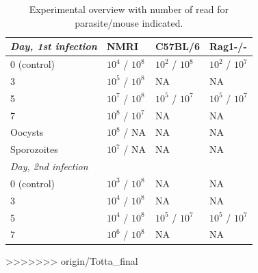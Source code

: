 \documentclass{bmcart}
\begin{document}
	\setlength{\tabcolsep}{14pt}
	\begin{table}[H]
	\small
	\begin{center}
	\caption{Experimental overview with number of read for parasite/mouse indicated.}
\begin{tabular}{*4l}    \toprule
\textit{Day, 1st infection}  	& NMRI  & C57BL/6  & Rag1-/- \\ \midrule
	0 (control)    & $10^4$ / $10^8$  & $10^2$ / $10^8$  & $10^2$ / $10^7$  \\ %
3  		& $10^5$ / $10^8$ & NA  & NA \\ 
5  		& $10^7$ / $10^8$ & $10^5$ / $10^7$  & $10^5$ / $10^7$ \\
7  		& $10^8$ / $10^7$ & NA  & NA \\ 
Oocysts 	& $10^8$ / NA & NA  & NA \\ 
Sporozoites 	& $10^7$ / NA & NA  & NA \\ \midrule

\textit{Day, 2nd infection}  	\\ \midrule
0 (control)     & $10^3$ / $10^8$  &  NA  & NA  \\ %
3  		& $10^4$ / $10^8$ & NA  & NA \\ 
5  		& $10^4$ / $10^8$ & $10^5$ / $10^7$  & $10^5$ / $10^7$ \\
7  		& $10^6$ / $10^8$ & NA  & NA \\ 
	
	
	\bottomrule
 \hline
\end{tabular}
\end{center}
\end{table}
>>>>>>> origin/Totta_final




\clearpage
\end{document}
